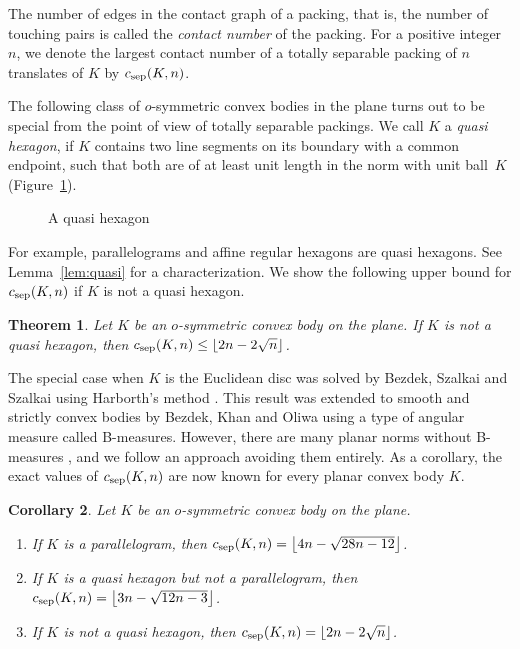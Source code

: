 \documentclass[a4paper,12pt]{article}
\theoremstyle{plain}
\newtheorem{theorem}{Theorem}
\newtheorem{corollary}[theorem]{Corollary}
\theoremstyle{definition}
\newcommand{\csep}{c_{\textnormal{sep}}} %
\newcommand{\floor}[1]{\left\lfloor#1\right\rfloor}
\begin{document}
The number of edges in the contact graph of a packing, that is, the number of 
touching pairs is called the \emph{contact number} of the packing. For a 
positive integer $n$, we denote the largest contact number of a totally 
separable packing of $n$ translates of $K$ by $\csep(K,n)$.

The following class of $o$-symmetric convex bodies in the plane turns out to be 
special from the point of view of totally separable packings. We call $K$ 
a \emph{quasi hexagon}, if $K$ contains two line segments on its boundary with a common 
endpoint, such that both are of at least unit length in the norm with unit 
ball~$K$ (Figure~\ref{fig:quasi}).
\begin{figure}
\centering
\caption{A quasi hexagon}\label{fig:quasi}
\end{figure}
For example, parallelograms and affine regular hexagons are quasi hexagons.
See Lemma~\ref{lem:quasi} for a characterization.
We show the following upper bound for $\csep(K,n)$ if $K$ is not a quasi hexagon.
\begin{theorem}\label{thm:csep}
 Let $K$ be an $o$-symmetric convex body on the plane.
 If $K$ is not a quasi hexagon, then $\csep(K,n)\leq\floor{2n-2\sqrt{n}}$.
\end{theorem}
The special case when $K$ is the Euclidean disc 
was solved by Bezdek, Szalkai and Szalkai \cite{BSS16} using Harborth's method 
\cite{H74}. 
This result was extended to smooth and strictly convex bodies by Bezdek, Khan 
and Oliwa \cite{BKO} using a type of angular measure called B-measures.
However, there are many planar norms without B-measures \cite{NPS20}, and we follow an approach avoiding them entirely.
As a corollary, the exact values of $\csep(K,n)$ are now known for every planar convex body $K$.

\begin{corollary}\label{cor:csep}
 Let $K$ be an $o$-symmetric convex body on the plane.
 \begin{enumerate}
  \item If $K$ is a parallelogram, then $\csep(K,n)=\floor{4n-\sqrt{28n-12}}$.
  \item If $K$ is a quasi hexagon but not a parallelogram, then 
$\csep(K,n)=\floor{3n-\sqrt{12n-3}}$.
  \item If $K$ is not a quasi hexagon, then $\csep(K,n)=\floor{2n-2\sqrt{n}}$.
 \end{enumerate}
\end{corollary}
\end{document}
